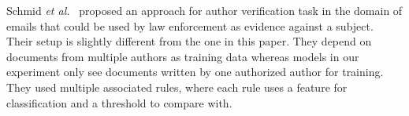 \documentclass[11pt]{article}
\begin{document}
Schmid \emph{et al.}~\cite{Schmid:2015} proposed an approach for author verification task in the domain of emails that could be used by law enforcement as evidence against a subject. Their setup is slightly different from the one in this paper. They depend on  documents from multiple authors as training data whereas models in our experiment only see documents written by one authorized author for training. They used multiple associated rules, where each rule uses a feature for classification and a threshold to compare with. 




\end{document}
